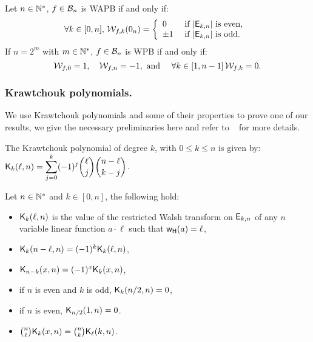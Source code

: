 \documentclass[11pt]{llncs}
\begin{document}
\begin{Prop}\label{prop:WAPBWalsh}

	Let $n\in \mathbb{N}^*$, $f\in \mathcal{B}_{n}$ is WAPB if and only if:
	\[\forall k \in [0,n], \, \mathcal{W}_{f,k}(0_n)=
	\left \{
	\begin{array}{l l}
	0  & \text{ if } |\mathsf{E}_{k,n}| \text{ is even, } \\
	\pm 1 & \text{ if }  |\mathsf{E}_{k,n}| \text{ is odd.}
	\end{array}\right. \]
	If $n=2^m$ with $m\in \mathbb{N}^*$, $f\in \mathcal{B}_{n}$ is WPB if and only if:
	\[\mathcal{W}_{f,0}=1, \quad \mathcal{W}_{f,n}=-1, \text{ and } \quad \forall k \in [1,n-1] \,  \mathcal{W}_{f,k}=0. \]

\end{Prop}


\subsubsection{Krawtchouk polynomials.}
We use Krawtchouk polynomials and some of their properties to prove one of our results, we give the necessary preliminaries here and refer to \eg ~\cite{book:MacSlo78} for more details.

\begin{definition}\label{def:Kraw}
	The Krawtchouk polynomial of degree $k$, with $0\leq k\leq n$ is given by: $ \displaystyle \mathsf{K}_{k}(\ell,n)=\sum_{j=0}^{k} (-1)^j \binom{\ell}{j} \binom{n-\ell}{k-j}$.
\end{definition}


\begin{Prop}\label{prop:Kr}
	Let $n\in \mathbb{N}^*$ and $k\in [0,n]$, the following hold:
\begin{itemize}
	\item $\mathsf{K}_{k}(\ell,n)$ is the value of the restricted Walsh transform on $\mathsf{E}_{k,n}$ of any $n$ variable linear function $a\cdot \ell$ such that $\mathsf{w_H}(a)=\ell$,
	\item $\mathsf{K}_{k}(n-\ell,n)=(-1)^k \mathsf{K}_{k}(\ell,n)$,
	\item $\mathsf{K}_{n-k}(x,n)=(-1)^x \mathsf{K}_{k}(x,n)$,
		\item if $n$ is even and $k$ is odd, $\mathsf{K}_{k}(n/2,n)=0$,
	\item if $n$ is even, $\mathsf{K}_{n/2}(1,n)=0$.
	\item $\binom{n}{\ell}\mathsf{K}_{k}(x,n)=\binom{n}{k}\mathsf{K}_{\ell}(k,n)$.
	\end{itemize}
\end{Prop}
\end{document}
